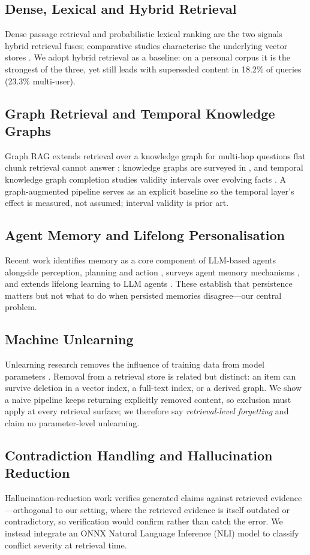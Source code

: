 \documentclass[conference]{IEEEtran}
\begin{document}
\subsection{Dense, Lexical and Hybrid Retrieval}
Dense passage retrieval \cite{b3} and probabilistic lexical ranking \cite{b4} are the two signals hybrid retrieval fuses; comparative studies characterise the underlying vector stores \cite{b5}. We adopt hybrid retrieval as a baseline: on a personal corpus it is the strongest of the three, yet still leads with superseded content in 18.2\% of queries (23.3\% multi-user).

\subsection{Graph Retrieval and Temporal Knowledge Graphs}
Graph RAG extends retrieval over a knowledge graph for multi-hop questions flat chunk retrieval cannot answer \cite{b6,b7}; knowledge graphs are surveyed in \cite{b8}, and temporal knowledge graph completion studies validity intervals over evolving facts \cite{b9}. A graph-augmented pipeline serves as an explicit baseline so the temporal layer's effect is measured, not assumed; interval validity is prior art.

\subsection{Agent Memory and Lifelong Personalisation}
Recent work identifies memory as a core component of LLM-based agents alongside perception, planning and action \cite{b10}, surveys agent memory mechanisms \cite{b11}, and extends lifelong learning to LLM agents \cite{b12}. These establish that persistence matters but not what to do when persisted memories disagree---our central problem.

\subsection{Machine Unlearning}
Unlearning research removes the influence of training data from model parameters \cite{b13}. Removal from a retrieval store is related but distinct: an item can survive deletion in a vector index, a full-text index, or a derived graph. We show a naive pipeline keeps returning explicitly removed content, so exclusion must apply at every retrieval surface; we therefore say \emph{retrieval-level forgetting} and claim no parameter-level unlearning.

\subsection{Contradiction Handling and Hallucination Reduction}
Hallucination-reduction work verifies generated claims against retrieved evidence \cite{b14,b15,b16,b17}---orthogonal to our setting, where the retrieved evidence is itself outdated or contradictory, so verification would confirm rather than catch the error. We instead integrate an ONNX Natural Language Inference (NLI) model to classify conflict severity at retrieval time.
\end{document}
